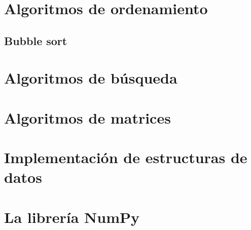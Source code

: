 \documentclass{report}
\begin{document}
\clearpage\chapter{Algoritmos de ordenamiento}

\section{Bubble sort}

\clearpage\chapter{Algoritmos de búsqueda}

\clearpage\chapter{Algoritmos de matrices}

\clearpage\chapter{Implementación de estructuras de datos}

\clearpage\chapter{La librería NumPy}
\end{document}
